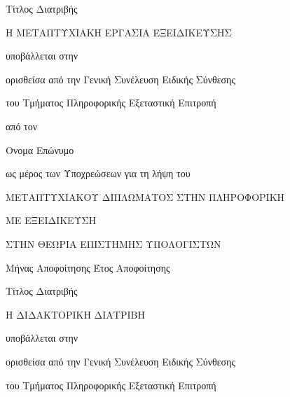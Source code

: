 \documentclass{cseuoi-thesis}
\theoremstyle{plain}   %
\theoremstyle{plain}   %
\theoremstyle{plain}   %
\theoremstyle{plain}   %
\theoremstyle{definition}  %
\theoremstyle{definition}  %
\theoremstyle{plain}  %
\begin{document}
\begin{titlepage}
\begin{center}
\vspace*{0.5in} {\LARGE Τίτλος Διατριβής}
\par
\vspace{1in} {\Large Η
 ΜΕΤΑΠΤΥΧΙΑΚΗ ΕΡΓΑΣΙΑ ΕΞΕΙΔΙΚΕΥΣΗΣ}

\vspace{0.5in} {\Large υποβάλλεται στην}

\vspace{0.2in} {\Large ορισθείσα από την Γενική Συνέλευση Ειδικής
Σύνθεσης}

\vspace{0.2in} {\Large του Τμήματος Πληροφορικής Εξεταστική
Επιτροπή}

\vspace{0.5in} {\Large από τον }

\vspace{0.7in} {\LARGE Ονομα Επώνυμο}

\vspace{0.5in} {\Large ως μέρος των Υποχρεώσεων για τη λήψη του}

\vspace{0.7in} {\Large ΜΕΤΑΠΤΥΧΙΑΚΟΥ ΔΙΠΛΩΜΑΤΟΣ ΣΤΗΝ ΠΛΗΡΟΦΟΡΙΚΗ}

\vspace{0.2in} {\Large ΜΕ ΕΞΕΙΔΙΚΕΥΣΗ}

\vspace{0.2in} {\Large ΣΤΗΝ ΘΕΩΡΙΑ ΕΠΙΣΤΗΜΗΣ ΥΠΟΛΟΓΙΣΤΩΝ }
\par
\vspace{1.4in} {\Large Μήνας Αποφοίτησης Έτος Αποφοίτησης}
\par\vspace{0.6in}
\end{center}


\newpage
\thispagestyle{empty}
\begin{center}
\vspace*{0.5in} {\LARGE Τίτλος Διατριβής}
\par
\vspace{1in} {\Large Η ΔΙΔΑΚΤΟΡΙΚΗ ΔΙΑΤΡΙΒΗ}

\vspace{0.5in} {\Large υποβάλλεται στην}

\vspace{0.2in} {\Large ορισθείσα από την Γενική Συνέλευση Ειδικής
Σύνθεσης}

\vspace{0.2in} {\Large του Τμήματος Πληροφορικής Εξεταστική
Επιτροπή}


\end{center}
\end{titlepage}
\end{document}
